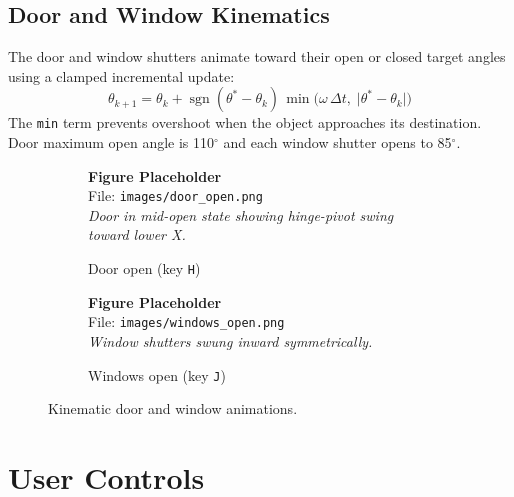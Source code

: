 \documentclass[12pt, a4paper]{article}
\newcommand{\imgph}[2]{%
    \begin{mdframed}[backgroundcolor=lightblue!60, linecolor=sectionblue,
                     linewidth=1pt, roundcorner=4pt, innertopmargin=8pt,
                     innerbottommargin=8pt]
        \centering
        {\bfseries\color{sectionblue} Figure Placeholder}\\[4pt]
        File: \texttt{#1}\\[3pt]
        {\small\itshape #2}
    \end{mdframed}%
}
\begin{document}
\subsection{Door and Window Kinematics}

The door and window shutters animate toward their open or closed target angles using a clamped incremental update:
\begin{equation}
    \theta_{k+1} = \theta_k + \operatorname{sgn}(\theta^{*}-\theta_k)\,
    \min\!\bigl(\omega\,\Delta t,\;\lvert\theta^{*}-\theta_k\rvert\bigr)
    \label{eq:doorupdate}
\end{equation}
The \texttt{min} term prevents overshoot when the object approaches its destination. Door maximum open angle is 110$^\circ$ and each window shutter opens to 85$^\circ$.

\begin{figure}[H]
    \centering
    \begin{subfigure}{0.47\textwidth}
        \imgph{images/door_open.png}{Door in mid-open state showing hinge-pivot swing toward lower X.}
        \caption{Door open (key \texttt{H})}
    \end{subfigure}\hfill
    \begin{subfigure}{0.47\textwidth}
        \imgph{images/windows_open.png}{Window shutters swung inward symmetrically.}
        \caption{Windows open (key \texttt{J})}
    \end{subfigure}
    \caption{Kinematic door and window animations.}
    \label{fig:doorwindow}
\end{figure}

\section{User Controls}
\end{document}
